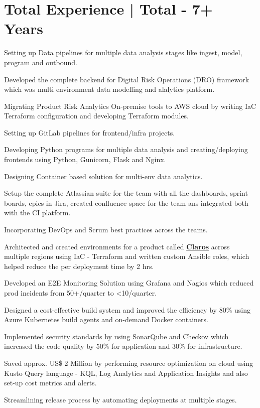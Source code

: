 \documentclass[a4paper]{deedy-resume-openfont}
\begin{document}
\section{Total Experience |  \bf\fontsize{10}{15}\selectfont Total - 7+ Years}
\vspace{\topsep} %
\begin{tightemize}
\item Setting up Data pipelines for multiple data analysis stages like ingest, model, program and outbound.
\item Developed the complete backend for Digital Risk Operations (DRO) framework which was multi environment data modelling and alalytics platform.
\item Migrating Product Risk Analytics On-premise tools to AWS cloud by writing IaC Terraform configuration and developing Terraform modules.
\item Setting up GitLab pipelines for frontend/infra projects.
\item Developing Python programs for multiple data analysis and creating/deploying frontends using Python, Gunicorn, Flask and Nginx.
\item Designing Container based solution for multi-env data analytics.
\item Setup the complete Atlassian suite for the team with all the dashboards, sprint boards, epics in Jira, created confluence space for the team ans integrated both with the CI platform.
\item Incorporating DevOps and Scrum best practices across the teams.
\end{tightemize}
\sectionsep

\begin{tightemize}
\item Architected and created environments for a product called \href{https://www.hach.com/claros/overview#claros-video}{\bf Claros} across multiple regions using IaC - Terraform and written custom Ansible roles, which helped reduce the per deployment time by 2 hrs.
\item Developed an E2E Monitoring Solution using Grafana and Nagios which reduced prod incidents from 50+/quarter to <10/quarter.
\item Designed a cost-effective build system and improved the efficiency by 80\% using Azure Kubernetes build agents and on-demand Docker containers.
\item Implemented security standards by using SonarQube and Checkov which increased the code quality by 50\% for application and 30\% for infrastructure.
\item Saved approx. US\$ 2 Million by performing resource optimization on cloud using Kusto Query language - KQL, Log Analytics and Application Insights and also set-up cost metrics and alerts.
\item Streamlining release process by automating deployments at multiple stages.
\end{tightemize}
\sectionsep
\end{document}
